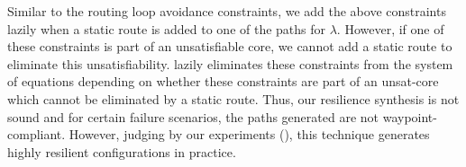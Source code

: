Similar to the routing loop avoidance constraints, we add the
above constraints lazily when a static route is added to one of the
paths for $\lambda$. However, if one of these constraints is part of 
an unsatisfiable core, we cannot add a static route to eliminate 
this unsatisfiability. \name lazily eliminates these constraints from the
system of equations depending on whether these constraints are part of 
an unsat-core which cannot be eliminated by a static route. Thus, 
our resilience synthesis is not sound and for certain failure scenarios, 
the paths generated are not waypoint-compliant. However, 
judging by our experiments (), 
this technique generates highly resilient configurations 
in practice. 
